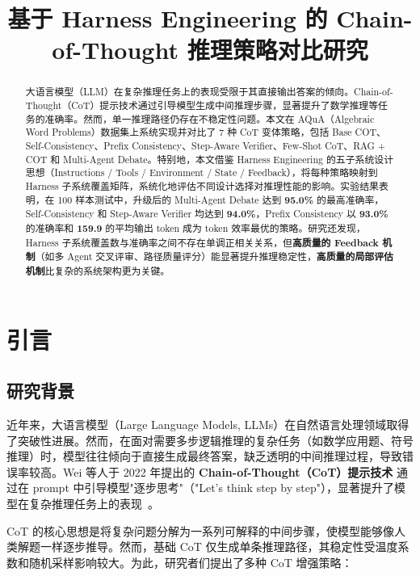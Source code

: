 \documentclass[lang=cn,a4paper,newtx]{elegantpaper}
\title{基于 Harness Engineering 的 Chain-of-Thought 推理策略对比研究}
\institute{项目地址：\href{https://github.com/SHenpengYU01/nlp-cot}{https://github.com/SHenpengYU01/nlp-cot}}
\date{\zhdate{2026/6/22}}
\begin{document}
\maketitle

\begin{abstract}
大语言模型（LLM）在复杂推理任务上的表现受限于其直接输出答案的倾向。Chain-of-Thought（CoT）提示技术通过引导模型生成中间推理步骤，显著提升了数学推理等任务的准确率。然而，单一推理路径仍存在不稳定性问题。本文在 AQuA（Algebraic Word Problems）数据集上系统实现并对比了 7 种 CoT 变体策略，包括 Base COT、Self-Consistency、Prefix Consistency、Step-Aware Verifier、Few-Shot CoT、RAG + COT 和 Multi-Agent Debate。特别地，本文借鉴 Harness Engineering 的五子系统设计思想（Instructions / Tools / Environment / State / Feedback），将每种策略映射到 Harness 子系统覆盖矩阵，系统化地评估不同设计选择对推理性能的影响。实验结果表明，在 100 样本测试中，升级后的 Multi-Agent Debate 达到 \textbf{95.0\%} 的最高准确率，Self-Consistency 和 Step-Aware Verifier 均达到 \textbf{94.0\%}，Prefix Consistency 以 \textbf{93.0\%} 的准确率和 \textbf{159.9} 的平均输出 token 成为 token 效率最优的策略。研究还发现，Harness 子系统覆盖数与准确率之间不存在单调正相关关系，但\textbf{高质量的 Feedback 机制}（如多 Agent 交叉评审、路径质量评分）能显著提升推理稳定性，\textbf{高质量的局部评估机制}比复杂的系统架构更为关键。
\end{abstract}

\section{引言}

\subsection{研究背景}

近年来，大语言模型（Large Language Models, LLMs）在自然语言处理领域取得了突破性进展。然而，在面对需要多步逻辑推理的复杂任务（如数学应用题、符号推理）时，模型往往倾向于直接生成最终答案，缺乏透明的中间推理过程，导致错误率较高。Wei 等人于 2022 年提出的 \textbf{Chain-of-Thought（CoT）提示技术} 通过在 prompt 中引导模型"逐步思考"（"Let's think step by step"），显著提升了模型在复杂推理任务上的表现~\cite{wei2022cot}。

CoT 的核心思想是将复杂问题分解为一系列可解释的中间步骤，使模型能够像人类解题一样逐步推导。然而，基础 CoT 仅生成单条推理路径，其稳定性受温度系数和随机采样影响较大。为此，研究者们提出了多种 CoT 增强策略：
\end{document}
